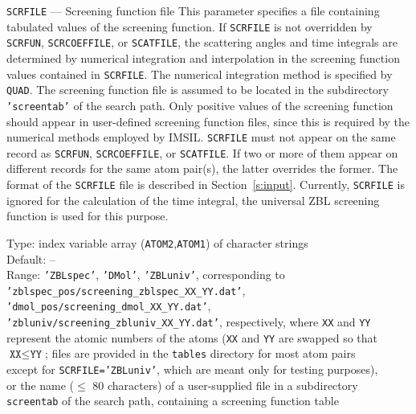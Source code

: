 \begin{keydescription}{\texttt{SCRFILE} --- Screening function file}
%
  This parameter specifies a file containing tabulated values of the
  screening function. If \texttt{SCRFILE} is not overridden by \texttt{SCRFUN},
  \texttt{SCRCOEFFILE}, or \texttt{SCATFILE}, the scattering angles and time 
  integrals are determined
  by numerical integration and interpolation in the screening function values
  contained in \texttt{SCRFILE}. The numerical integration method is specified 
  by \texttt{QUAD}. The screening function file is assumed to be 
  located in the subdirectory \texttt{'screentab'} of the search path. 
  Only positive values of the screening function should appear in user-defined
  screening function files, since this is required by the numerical methods 
  employed by IMSIL. \texttt{SCRFILE} must not appear on the same record as 
  \texttt{SCRFUN}, \texttt{SCRCOEFFILE}, or \texttt{SCATFILE}. If two or more 
  of them appear on different records for the same atom pair(s), the latter 
  overrides the former. The format of the \texttt{SCRFILE} file is described 
  in Section~\ref{s:input}. Currently, 
  \texttt{SCRFILE} is ignored for the calculation of the time integral, the 
  universal ZBL screening function is used for this purpose.
  \begin{keytab}
    Type:    \> index variable array (\texttt{ATOM2},\texttt{ATOM1}) 
                of character strings \\ 
    Default: \> -- \\
    Range:   \> \texttt{'ZBLspec'}, \texttt{'DMol'}, \texttt{'ZBLuniv'}, 
                 corresponding to \\
             \> \texttt{'zblspec\_pos/screening\_zblspec\_XX\_YY.dat'}, \\
             \> \texttt{'dmol\_pos/screening\_dmol\_XX\_YY.dat'}, \\
             \> \texttt{'zbluniv/screening\_zbluniv\_XX\_YY.dat'}, respectively,
                where \texttt{XX} and \texttt{YY} \\ 
             \> represent the atomic numbers of the atoms (\texttt{XX} and 
                \texttt{YY} are swapped so that \\ 
             \> $\texttt{XX} \le \texttt{YY}$; 
                files are provided in the \texttt{tables} directory for 
                most atom pairs \\
             \> except for \texttt{SCRFILE='ZBLuniv'}, which are meant only 
                for testing purposes), \\
             \> or the name ($\le$ 80 characters) of a user-supplied
                file in a subdirectory \\
             \> \texttt{screentab} of the search path, containing 
                a screening function table 
  \end{keytab}
\end{keydescription}

